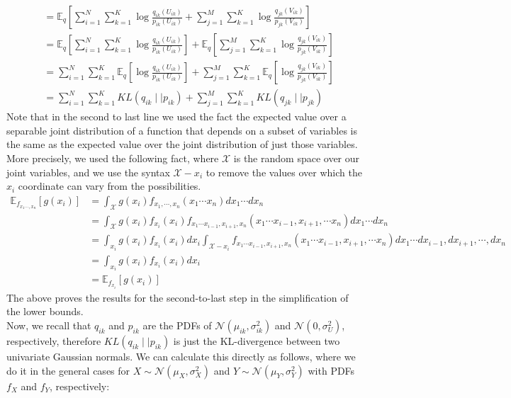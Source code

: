 \documentclass{harvardml}
\newcommand{\E}{\mathbb{E}}
\newcommand{\N}{\mathcal{N}}
\theoremstyle{plain}
\begin{document}
\begin{enumerate}
\begin{align*}
&= \E_q \left[\sum_{i=1}^N \sum_{k=1}^K \log \frac{q_{ik}(U_{ik})}{p_{ik}(U_{ik})} + \sum_{j=1}^M \sum_{k=1}^K \log \frac{q_{jk}(V_{ik})}{p_{jk}(V_{ik})}\right] \tag{using properties of the log to split products into sums} \\
&= \E_q \left[\sum_{i=1}^N \sum_{k=1}^K \log \frac{q_{ik}(U_{ik})}{p_{ik}(U_{ik})}\right] + \E_q \left[ \sum_{j=1}^M \sum_{k=1}^K \log \frac{q_{jk}(V_{ik})}{p_{jk}(V_{ik})}\right] \\
&=  \sum_{i=1}^N \sum_{k=1}^K \E_q  \left[ \log \frac{q_{ik}(U_{ik})}{p_{ik}(U_{ik})}\right] + \sum_{j=1}^M \sum_{k=1}^K \E_q \left[ \log \frac{q_{jk}(V_{ik})}{p_{jk}(V_{ik})}\right] \tag{linearity of expectation} \\
&= \sum_{i=1}^N \sum_{k=1}^K KL(q_{ik} \mid \mid p_{ik}) + \sum_{j=1}^M \sum_{k=1}^K KL(q_{jk} \mid \mid p_{jk})
\end{align*}
Note that in the second to last line we used the fact the expected value over a separable joint distribution of a function that depends on a subset of variables is the same as the expected value over the joint distribution of just those variables. More precisely, we used the following fact, where $\mathcal{X}$ is the random space over our joint variables, and we use the syntax $\mathcal{X} - x_i$ to remove the values over which the $x_i$ coordinate can vary from the possibilities.
\begin{align*}
\E_{f_{x_1 \cdots, x_n}}[g(x_i)] &= \int_{\mathcal{X}} g(x_i) f_{x_1, \cdots, x_n}(x_1 \cdots x_n) dx_1 \cdots dx_n \\
&= \int_{\mathcal{X}} g(x_i) f_{x_i}(x_i) f_{x_1 \cdots x_{i-1}, x_{i+1}, x_n}(x_{1} \cdots x_{i-1}, x_{i+1}, \cdots x_n) dx_1 \cdots dx_n \tag{separable pdf} \\
&= \int_{x_i} g(x_i) f_{x_i}(x_i) dx_i \int_{\mathcal{X} - x_i}  f_{x_1 \cdots x_{i-1}, x_{i+1}, x_n}(x_{1} \cdots x_{i-1}, x_{i+1}, \cdots x_n) dx_1 \cdots dx_{i-1}, dx_{i+1}, \cdots, dx_n \\
&= \int_{x_i} g(x_i) f_{x_i}(x_i) dx_i \tag{integral of PDF is 1}\\
&= \E_{f_{x_i}}[g(x_i)]
\end{align*}
The above proves the results for the second-to-last step in the simplification of the lower bounds.\\
Now, we recall that $q_{ik}$ and $p_{ik}$ are the PDFs of $\N(\mu_{ik}, \sigma_{ik}^2)$ and $\N(0, \sigma_U^2)$, respectively, therefore $KL(q_{ik} \mid \mid p_{ik})$ is just the KL-divergence between two univariate Gaussian normals. We can calculate this directly as follows, where we do it in the general cases for $X \sim \N(\mu_X, \sigma_X^2)$ and $Y \sim \N(\mu_Y, \sigma_Y^2)$ with PDFs $f_X$ and $f_Y$, respectively:

\end{enumerate}
\end{document}
